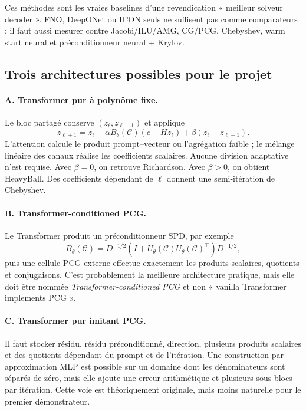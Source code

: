 \documentclass[11pt,a4paper]{article}
\newcommand{\cC}{\mathcal{C}}
\begin{document}
Ces méthodes sont les vraies baselines d'une revendication « meilleur solveur
decoder ». FNO, DeepONet ou ICON seuls ne suffisent pas comme comparateurs : il
faut aussi mesurer contre Jacobi/ILU/AMG, CG/PCG, Chebyshev, warm start neural
et préconditionneur neural + Krylov.

\subsection{Trois architectures possibles pour le projet}

\paragraph{A. Transformer pur à polynôme fixe.}
Le bloc partagé conserve $(z_\ell,z_{\ell-1})$ et applique
\begin{equation}
z_{\ell+1}=z_\ell+\alpha B_\theta(\cC)
(c-Hz_\ell)+\beta(z_\ell-z_{\ell-1}).
\label{eq:hb}
\end{equation}
L'attention calcule le produit prompt--vecteur ou l'agrégation faible ; le
mélange linéaire des canaux réalise les coefficients scalaires. Aucune division
adaptative n'est requise. Avec $\beta=0$, on retrouve Richardson. Avec
$\beta>0$, on obtient HeavyBall. Des coefficients dépendant de $\ell$ donnent
une semi-itération de Chebyshev.

\paragraph{B. Transformer-conditioned PCG.}
Le Transformer produit un préconditionneur SPD, par exemple
\[
 B_\theta(\cC)=D^{-1/2}
 (I+U_\theta(\cC)U_\theta(\cC)^\top)D^{-1/2},
\]
puis une cellule PCG externe effectue exactement les produits scalaires,
quotients et conjugaisons. C'est probablement la meilleure architecture
pratique, mais elle doit être nommée \emph{Transformer-conditioned PCG} et non
« vanilla Transformer implements PCG ».

\paragraph{C. Transformer pur imitant PCG.}
Il faut stocker résidu, résidu préconditionné, direction, plusieurs produits
scalaires et des quotients dépendant du prompt et de l'itération. Une
construction par approximation MLP est possible sur un domaine dont les
dénominateurs sont séparés de zéro, mais elle ajoute une erreur arithmétique et
plusieurs sous-blocs par itération. Cette voie est théoriquement originale,
mais moins naturelle pour le premier démonstrateur.
\end{document}
